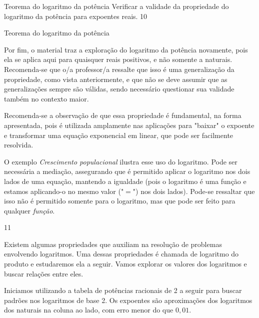 \begin{objectives}{Teorema do logaritmo da potência}
{
	Verificar a validade da propriedade do logaritmo da potência para expoentes reais.
}{1}{0}
\end{objectives}
\clearpage
\begin{sugestions}{Teorema do logaritmo da potência}
{
	Por fim, o material traz a exploração do logaritmo da potência novamente, pois  ela se aplica aqui para quaisquer reais positivos, e não somente a naturais. Recomenda-se que o/a professor/a ressalte que isso é uma generalização da propriedade, como vista anteriormente, e que não se deve assumir que as generalizações sempre são válidas, sendo necessário questionar sua validade também no contexto maior.

	Recomenda-se a observação de que essa propriedade é fundamental, na forma apresentada, pois é utilizada amplamente nas aplicações para "baixar" o expoente e transformar uma equação exponencial em linear, que pode ser facilmente resolvida.

	O exemplo \textit{Crescimento populacional} ilustra esse uso do logaritmo. Pode ser necessária a mediação, assegurando que é permitido aplicar o logaritmo nos dois lados de uma equação, mantendo a igualdade (pois o logaritmo é uma função e estamos aplicando-o no mesmo valor ("$=$") nos dois lados). Pode-se ressaltar que isso não é permitido somente para o logaritmo, mas que pode ser feito para qualquer \textit{função}.
}{1}{1}
\end{sugestions}
\label{prod_logaritmo}

Existem algumas propriedades que auxiliam na resolução de problemas envolvendo logaritmos. Uma dessas propriedades é chamada de logaritmo do produto e estudaremos ela a seguir.  Vamos explorar os valores dos logaritmos e buscar relações entre eles.%


Iniciamos utilizando a tabela de potências racionais de 2 a seguir para buscar padrões nos logaritmos de base 2. Os expoentes são aproximações dos logaritmos dos naturais na coluna ao lado, com erro menor do que $0,01$.

